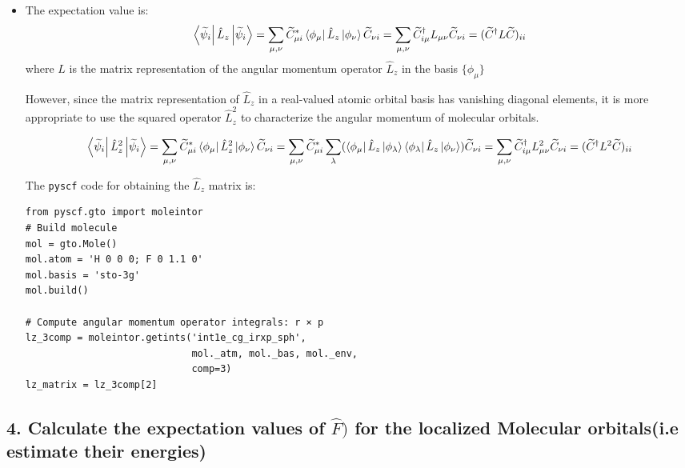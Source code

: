 \documentclass{article}
\begin{document}
\begin{itemize}
    \item The expectation value is:
    \[
    \bra{\widetilde{\psi}_i} {\hat{L}_z}\ket{\widetilde{\psi}_i} = \sum_{\mu,\nu} \widetilde{C}_{\mu i}^{*} \bra{\phi_\mu} \hat{L}_z \ket{\phi_\nu} \widetilde{C}_{\nu i} = \sum_{\mu,\nu} \widetilde{C}_{i \mu}^{\dagger} L_{\mu \nu} \widetilde{C}_{\nu i} = (\widetilde{C}^{\dagger} L \widetilde{C})_{ii}
    \]
    where \( L \) is the matrix representation of the angular momentum operator \(\hat{L}_z\) in the basis \( \{ \phi_\mu \} \) 

    However, since the matrix representation of $\hat{L}_z$ in a real-valued atomic orbital basis has vanishing diagonal elements, it is more appropriate to use the squared operator $\hat{L}_z^2$ to characterize the angular momentum of molecular orbitals.

    \[
    \bra{\widetilde{\psi}_i} {\hat{L}_z^{2}}\ket{\widetilde{\psi}_i} = \sum_{\mu,\nu} \widetilde{C}_{\mu i}^{*} \bra{\phi_\mu} \hat{L}_z^{2} \ket{\phi_\nu} \widetilde{C}_{\nu i} = \sum_{\mu,\nu} \widetilde{C}_{\mu i}^{*} \sum_{\lambda}( \bra{\phi_\mu} \hat{L}_z \ket{\phi_\lambda} \bra{\phi_\lambda} \hat{L}_z\ket{\phi_\nu}) \widetilde{C}_{\nu i} = \sum_{\mu,\nu} \widetilde{C}_{i \mu}^{\dagger} L_{\mu \nu}^2 \widetilde{C}_{\nu i} = (\widetilde{C}^{\dagger} L^2 \widetilde{C})_{ii}
    \]

    The \verb|pyscf| code for obtaining the $\hat{L}_z$ matrix is:

\begin{verbatim}
from pyscf.gto import moleintor
# Build molecule
mol = gto.Mole()
mol.atom = 'H 0 0 0; F 0 1.1 0'  
mol.basis = 'sto-3g'            
mol.build()

# Compute angular momentum operator integrals: r × p
lz_3comp = moleintor.getints('int1e_cg_irxp_sph',
                             mol._atm, mol._bas, mol._env,
                             comp=3)
lz_matrix = lz_3comp[2]

\end{verbatim}
\end{itemize}

\subsection*{4. Calculate the expectation values of \(\hat{F})\) for the localized Molecular orbitals(i.e estimate their energies)}
\end{document}
